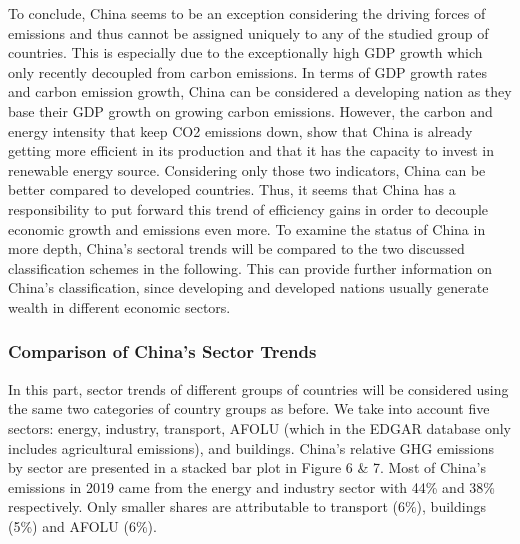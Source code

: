 \documentclass[
  12pt,
]{article}
\numberwithin{equation}{section}
\numberwithin{table}{section}
\numberwithin{figure}{section}
\begin{document}
To conclude, China seems to be an exception considering the driving
forces of emissions and thus cannot be assigned uniquely to any of the
studied group of countries. This is especially due to the exceptionally
high GDP growth which only recently decoupled from carbon emissions. In
terms of GDP growth rates and carbon emission growth, China can be
considered a developing nation as they base their GDP growth on growing
carbon emissions. However, the carbon and energy intensity that keep CO2
emissions down, show that China is already getting more efficient in its
production and that it has the capacity to invest in renewable energy
source. Considering only those two indicators, China can be better
compared to developed countries. Thus, it seems that China has a
responsibility to put forward this trend of efficiency gains in order to
decouple economic growth and emissions even more. To examine the status
of China in more depth, China's sectoral trends will be compared to the
two discussed classification schemes in the following. This can provide
further information on China's classification, since developing and
developed nations usually generate wealth in different economic sectors.

\hypertarget{comparison-of-chinas-sector-trends}{%
\subsubsection{Comparison of China's Sector
Trends}\label{comparison-of-chinas-sector-trends}}

In this part, sector trends of different groups of countries will be
considered using the same two categories of country groups as before. We
take into account five sectors: energy, industry, transport, AFOLU
(which in the EDGAR database only includes agricultural emissions), and
buildings. China's relative GHG emissions by sector are presented in a
stacked bar plot in Figure 6 \& 7. Most of China's emissions in 2019
came from the energy and industry sector with 44\% and 38\%
respectively. Only smaller shares are attributable to transport (6\%),
buildings (5\%) and AFOLU (6\%).
\end{document}
